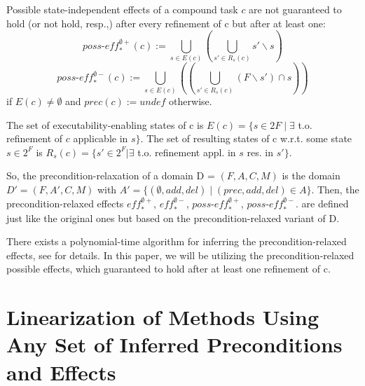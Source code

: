 \documentclass[letterpaper]{article} %
\newcommand{\RelEffPlus} {\ensuremath{\mathit{eff^{\emptyset +}_{*}}}}
\newcommand{\RelEffMinus} {\ensuremath{\mathit{eff^{\emptyset -}_{*}}}}
\newcommand{\RelPossEffPlus} {\ensuremath{\mathit{\textit{poss-eff}^{\emptyset +}_{*}}}}
\newcommand{\RelPossEffMinus} {\ensuremath{\mathit{\textit{poss-eff}^{\emptyset -}_{*}}}}
\begin{document}
Possible state-independent effects of a compound task $c$ are not guaranteed to hold (or not hold, resp.,)
after every refinement of c but after at least one:
$$ \RelPossEffPlus(c) := \bigcup_{s \in E(c)}  ( \bigcup_{s' \in R_s(c)}  s' \backslash s) $$
$$ \RelPossEffMinus(c) := \bigcup_{s \in E(c)} ((\bigcup_{s' \in R_s(c)} (F \backslash s') \cap s ))$$
if $E(c) \neq \emptyset$ and $prec(c) := undef$ otherwise.


The set of executability-enabling states of c is
$E(c) = \{s \in 2F  \mid  \exists$ t.o. refinement of $c$ applicable in $s \}$.
The set of resulting states of c w.r.t. some state $s \in 2^F$ is
$R_s(c) = \{s' \in 2^F | \exists$ t.o. refinement appl. in $s$ res. in $s' \}$.

So, the precondition-relaxation of a domain D = $(F, A, C, M)$ is the domain $D' = (F, A', C, M)$
with $A' = \{(\emptyset, add , del ) \mid (prec, add , del ) \in A\}$.
Then, the precondition-relaxed effects $\RelEffPlus$, $\RelEffMinus$, $\RelPossEffPlus$, $\RelPossEffMinus$. are defined just like the original ones but based on the precondition-relaxed variant of D.

There exists a polynomial-time algorithm for inferring the precondition-relaxed effects, see \cite{ConnyPreEstimation} for details.
In this paper, we will be utilizing the precondition-relaxed possible effects, which guaranteed to hold after at least one refinement of c.


\section{Linearization of Methods Using Any Set of Inferred Preconditions and Effects}
\end{document}
